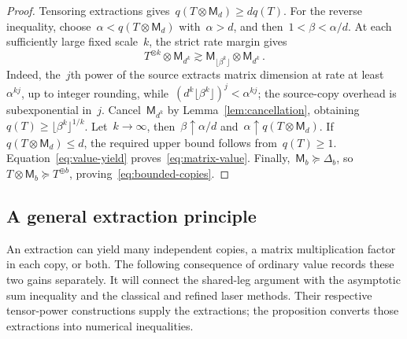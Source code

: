 \documentclass[11pt,letterpaper]{article}
\theoremstyle{definition}
\numberwithin{equation}{section}
\newcommand{\MM}{\mathsf M}
\newcommand{\res}{\succeq}
\begin{document}
\begin{proof}
Tensoring extractions gives~$q(T\otimes\MM_d)\geq dq(T)$. For the reverse inequality, choose~$\alpha<q(T\otimes\MM_d)$ with~$\alpha>d$, and then~$1<\beta<\alpha/d$. At each sufficiently large fixed scale~$k$, the strict rate margin gives
\begin{equation*}
 T^{\otimes k}\otimes\MM_{d^k}
 \gtrsim\MM_{\lfloor\beta^k\rfloor}\otimes\MM_{d^k}\,.
\end{equation*}
Indeed, the~$j$th power of the source extracts matrix dimension at rate at least~$\alpha^{kj}$, up to integer rounding, while~$(d^k\lfloor\beta^k\rfloor)^j<\alpha^{kj}$; the source-copy overhead is subexponential in~$j$. Cancel~$\MM_{d^k}$ by Lemma~\ref{lem:cancellation}, obtaining~$q(T)\geq\lfloor\beta^k\rfloor^{1/k}$. Let~$k\to\infty$, then~$\beta\uparrow\alpha/d$ and~$\alpha\uparrow q(T\otimes\MM_d)$. If~$q(T\otimes\MM_d)\leq d$, the required upper bound follows from~$q(T)\geq1$. Equation~\eqref{eq:value-yield} proves~\eqref{eq:matrix-value}. Finally,~$\MM_b\res\Delta_b$, so~$T\otimes\MM_b\res T^{\oplus b}$, proving~\eqref{eq:bounded-copies}.
\end{proof}


\subsection{A general extraction principle}\label{sec:general-extraction}

An extraction can yield many independent copies, a matrix multiplication factor in each copy, or both. The following consequence of ordinary value records these two gains separately. It will connect the shared-leg argument with the asymptotic sum inequality and the classical and refined laser methods. Their respective tensor-power constructions supply the extractions; the proposition converts those extractions into numerical inequalities.
\end{document}
